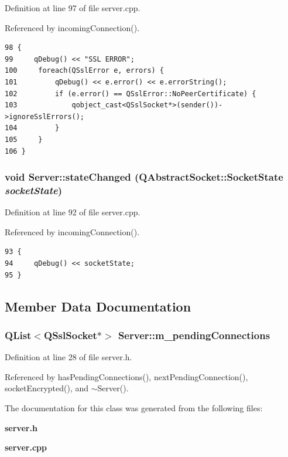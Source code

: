 Definition at line 97 of file server.cpp.

Referenced by incomingConnection().

\begin{Code}\begin{verbatim}98 {
99     qDebug() << "SSL ERROR";
100     foreach(QSslError e, errors) {
101         qDebug() << e.error() << e.errorString();
102         if (e.error() == QSslError::NoPeerCertificate) {
103             qobject_cast<QSslSocket*>(sender())->ignoreSslErrors();
104         }
105     }
106 }
\end{verbatim}
\end{Code}


\subsubsection{\setlength{\rightskip}{0pt plus 5cm}void Server::stateChanged (QAbstractSocket::SocketState {\em socketState})\hspace{0.3cm}{\tt  [protected, slot]}}\label{classServer_918bc8cfac493ef59184003bd67219f4}




Definition at line 92 of file server.cpp.

Referenced by incomingConnection().

\begin{Code}\begin{verbatim}93 {
94     qDebug() << socketState;
95 }
\end{verbatim}
\end{Code}




\subsection{Member Data Documentation}
\subsubsection{\setlength{\rightskip}{0pt plus 5cm}QList$<$QSslSocket$\ast$$>$ {\bf Server::m\_\-pendingConnections}\hspace{0.3cm}{\tt  [private]}}\label{classServer_293548423c35db7e0499696fa262ae95}




Definition at line 28 of file server.h.

Referenced by hasPendingConnections(), nextPendingConnection(), socketEncrypted(), and $\sim$Server().

The documentation for this class was generated from the following files:\begin{CompactItemize}
\item 
{\bf server.h}\item 
{\bf server.cpp}\end{CompactItemize}
